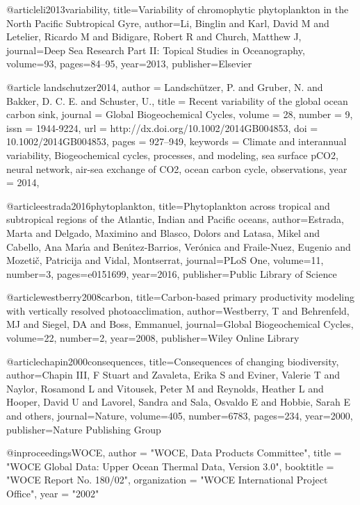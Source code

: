 {{{{{{{{{{{{@article{li2013variability,
  title={Variability of chromophytic phytoplankton in the North Pacific Subtropical Gyre},
  author={Li, Binglin and Karl, David M and Letelier, Ricardo M and Bidigare, Robert R and Church, Matthew J},
  journal={Deep Sea Research Part II: Topical Studies in Oceanography},
  volume={93},
  pages={84--95},
  year={2013},
  publisher={Elsevier}
}


@article {landschutzer2014,
author = {Landsch\"{u}tzer, P. and Gruber, N. and Bakker, D. C. E. and Schuster, U.},
title = {Recent variability of the global ocean carbon sink},
journal = {Global Biogeochemical Cycles},
volume = {28},
number = {9},
issn = {1944-9224},
url = {http://dx.doi.org/10.1002/2014GB004853},
doi = {10.1002/2014GB004853},
pages = {927--949},
keywords = {Climate and interannual variability, Biogeochemical cycles, processes, and modeling, sea surface pCO2, neural network, air-sea exchange of CO2, ocean carbon cycle, observations},
year = {2014},
}

@article{estrada2016phytoplankton,
  title={Phytoplankton across tropical and subtropical regions of the Atlantic, Indian and Pacific oceans},
  author={Estrada, Marta and Delgado, Maximino and Blasco, Dolors and Latasa, Mikel and Cabello, Ana Mar{\'\i}a and Ben{\'\i}tez-Barrios, Ver{\'o}nica and Fraile-Nuez, Eugenio and Mozeti{\v{c}}, Patricija and Vidal, Montserrat},
  journal={PLoS One},
  volume={11},
  number={3},
  pages={e0151699},
  year={2016},
  publisher={Public Library of Science}
}



@article{westberry2008carbon,
  title={Carbon-based primary productivity modeling with vertically resolved photoacclimation},
  author={Westberry, T and Behrenfeld, MJ and Siegel, DA and Boss, Emmanuel},
  journal={Global Biogeochemical Cycles},
  volume={22},
  number={2},
  year={2008},
  publisher={Wiley Online Library}
}

@article{chapin2000consequences,
  title={Consequences of changing biodiversity},
  author={Chapin III, F Stuart and Zavaleta, Erika S and Eviner, Valerie T and Naylor, Rosamond L and Vitousek, Peter M and Reynolds, Heather L and Hooper, David U and Lavorel, Sandra and Sala, Osvaldo E and Hobbie, Sarah E and others},
  journal={Nature},
  volume={405},
  number={6783},
  pages={234},
  year={2000},
  publisher={Nature Publishing Group}
}

@inproceedings{WOCE,
	author		= "WOCE, Data Products Committee",
	title		= "WOCE Global Data: Upper Ocean Thermal Data, Version 3.0",
	booktitle	= "WOCE Report No. 180/02",
	organization	= "WOCE International Project Office",
	year		= "2002"
}


}}}}}}}}}}}}
